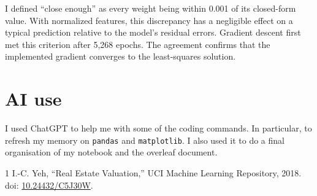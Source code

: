 \documentclass[11pt]{article}
\begin{document}
I defined ``close enough'' as every weight being within 0.001 of its closed-form
value. With normalized features, this discrepancy has a negligible effect on a
typical prediction relative to the model's residual errors. Gradient descent first
met this criterion after 5,268 epochs. The agreement confirms that the implemented
gradient converges to the least-squares solution.

\section{AI use}
I used ChatGPT to help me with some of the coding commands. In particular, to refresh my memory on \texttt{pandas} and \texttt{matplotlib}. I also used it to do a final organisation of my notebook and the overleaf document.

\begin{thebibliography}{1}
I.-C. Yeh, ``Real Estate Valuation,'' UCI Machine Learning Repository, 2018.
doi: \href{https://doi.org/10.24432/C5J30W}{10.24432/C5J30W}.
\end{thebibliography}
\end{document}
